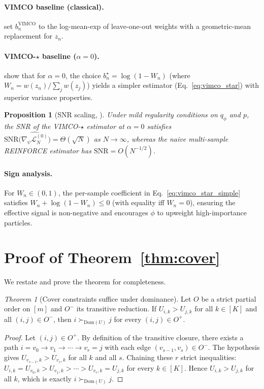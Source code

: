 \documentclass{article}
\newtheorem{proposition}[theorem]{Proposition}
\theoremstyle{definition}
\theoremstyle{remark}
\newtheorem*{theorem*}{Theorem}
\newcommand{\Dom}{\mathrm{Dom}}
\newcommand{\SNR}{\mathrm{SNR}}
\begin{document}
\paragraph{VIMCO baseline (classical).}
\citet{mnih2016vimco} set $b_n^{\mathrm{VIMCO}}$ to the
log-mean-exp of leave-one-out weights with a geometric-mean replacement
for $z_n$.

\paragraph{VIMCO-$\star$ baseline ($\alpha=0$).}
\citet{daudel2026importance} show that for $\alpha=0$, the choice
$b_n^{\star}=\log(1-W_n)$ (where $W_n=w(z_n)/\sum_j w(z_j)$)
yields a simpler estimator (Eq.~\ref{eq:vimco_star}) with superior
variance properties.

\begin{proposition}[SNR scaling, {\citet[Theorem~3]{daudel2026importance}}]
Under mild regularity conditions on $q_\phi$ and $p$, the SNR of the
VIMCO-$\star$ estimator at $\alpha=0$ satisfies
$\SNR\bigl(\widehat{\nabla_\psi\mathcal{L}^{(0)}_N}\bigr)
=\Theta(\sqrt{N})$ as $N\to\infty$,
whereas the naive multi-sample REINFORCE estimator has
$\SNR=O(N^{-1/2})$.
\end{proposition}

\paragraph{Sign analysis.}
For $W_n\in(0,1)$, the per-sample coefficient in
Eq.~\eqref{eq:vimco_star_simple} satisfies
$W_n+\log(1-W_n)\le 0$
(with equality iff $W_n=0$), ensuring the effective signal is
non-negative and encourages $\phi$ to upweight high-importance particles.

\section{Proof of Theorem~\ref{thm:cover}}
\label{app:cover_proof}

We restate and prove the theorem for completeness.

\begin{theorem*}[Cover constraints suffice under dominance]
Let $O$ be a strict partial order on $[m]$ and $O^-$ its transitive
reduction.
If $U_{i,k}>U_{j,k}$ for all $k\in[K]$ and all $(i,j)\in O^-$,
then $i\succ_{\Dom(U)}j$ for every $(i,j)\in O^+$.
\end{theorem*}

\begin{proof}
Let $(i,j)\in O^+$.
By definition of the transitive closure, there exists a
path $i=v_0\to v_1\to\cdots\to v_r=j$ with each edge
$(v_{s-1},v_s)\in O^-$.
The hypothesis gives $U_{v_{s-1},k}>U_{v_s,k}$ for all $k$ and all $s$.
Chaining these $r$ strict inequalities:
$U_{i,k}=U_{v_0,k}>U_{v_1,k}>\cdots>U_{v_r,k}=U_{j,k}$
for every $k\in[K]$.
Hence $U_{i,k}>U_{j,k}$ for all $k$, which is exactly
$i\succ_{\Dom(U)}j$.
\end{proof}
\end{document}
